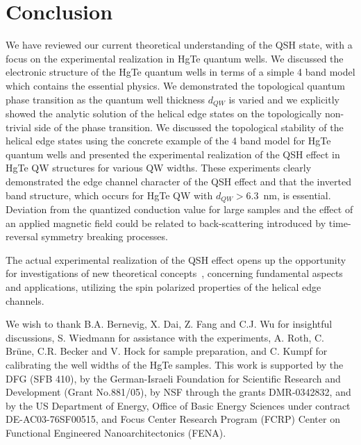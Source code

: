 \documentclass{article}
\begin{document}
\section{Conclusion}

We have reviewed our current theoretical understanding of the QSH
state, with a focus on the experimental realization in HgTe quantum
wells. We discussed the electronic structure of the HgTe quantum
wells in terms of a simple 4 band model which contains the essential
physics. We demonstrated the topological quantum phase transition as
the quantum well thickness $d_{QW}$ is varied and we explicitly
showed the analytic solution of the helical edge states on the
topologically non-trivial side of the phase transition. We discussed
the topological stability of the helical edge states using the
concrete example of the 4 band model for HgTe quantum wells and
presented the experimental realization of the QSH effect in HgTe QW
structures for various QW widths. These experiments clearly
demonstrated the edge channel character of the QSH effect and that
the inverted band structure, which occurs for HgTe QW with
$d_{QW}>6.3$~nm, is essential. Deviation from the quantized
conduction value for large samples and the effect of an applied
magnetic field could be related to back-scattering introduced by
time-reversal symmetry breaking processes.

The actual experimental realization of the QSH effect opens up the
opportunity for investigations of new theoretical
concepts~\cite{qi2007}, concerning fundamental aspects and
applications, utilizing the spin polarized properties of the helical
edge channels.

We wish to thank B.A. Bernevig, X. Dai, Z. Fang and C.J. Wu for
insightful discussions, S. Wiedmann for assistance with the
experiments, A. Roth, C. Br{\"u}ne, C.R. Becker and V. Hock for
sample preparation, and C. Kumpf for calibrating the well widths
of the HgTe samples. This work is supported by the DFG (SFB 410),
by the German-Israeli Foundation for Scientific Research and
Development (Grant No.881/05), by NSF through the grants
DMR-0342832, and by the US Department of Energy, Office of Basic
Energy Sciences under contract DE-AC03-76SF00515, and Focus Center
Research Program (FCRP) Center on Functional Engineered
Nanoarchitectonics (FENA).



\end{document}
